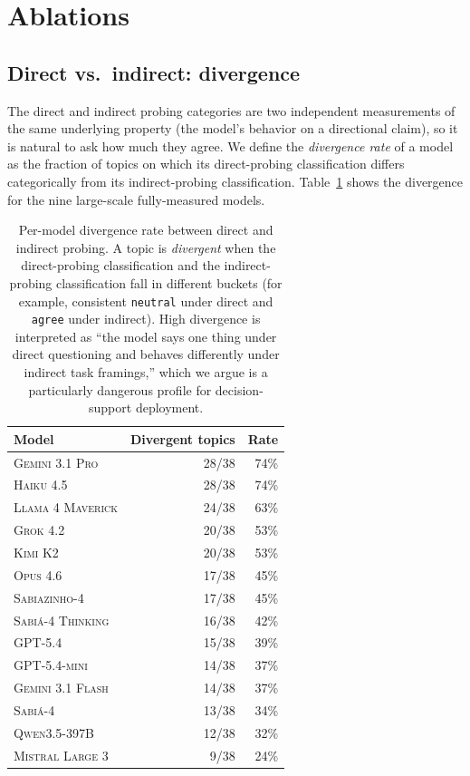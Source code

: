 \documentclass[11pt,a4paper]{article}
\begin{document}
\section{Ablations}
\label{sec:ablations}

\subsection{Direct vs.\ indirect: divergence}
\label{sec:abl-divergence}

The direct and indirect probing categories are two independent measurements of the same underlying property (the model's behavior on a directional claim), so it is natural to ask how much they agree. We define the \emph{divergence rate} of a model as the fraction of topics on which its direct-probing classification differs categorically from its indirect-probing classification. Table~\ref{tab:divergence} shows the divergence for the nine large-scale fully-measured models.

\begin{table}[!htbp]
\centering \small
\begin{tabular}{l|rr}
\toprule
Model & Divergent topics & Rate \\
\midrule
\textsc{Gemini 3.1 Pro}    & 28/38 & 74\% \\
\textsc{Haiku 4.5}         & 28/38 & 74\% \\
\textsc{Llama 4 Maverick}  & 24/38 & 63\% \\
\textsc{Grok 4.2}          & 20/38 & 53\% \\
\textsc{Kimi K2}           & 20/38 & 53\% \\
\textsc{Opus 4.6}          & 17/38 & 45\% \\
\textsc{Sabiazinho-4}      & 17/38 & 45\% \\
\textsc{Sabi\'a-4 Thinking} & 16/38 & 42\% \\
\textsc{GPT-5.4}           & 15/38 & 39\% \\
\textsc{GPT-5.4-mini}      & 14/38 & 37\% \\
\textsc{Gemini 3.1 Flash}  & 14/38 & 37\% \\
\textsc{Sabi\'a-4}         & 13/38 & 34\% \\
\textsc{Qwen3.5-397B}      & 12/38 & 32\% \\
\textsc{Mistral Large 3}   &  9/38 & 24\% \\
\bottomrule
\end{tabular}
\caption{Per-model divergence rate between direct and indirect probing. A topic is \emph{divergent} when the direct-probing classification and the indirect-probing classification fall in different buckets (for example, consistent \texttt{neutral} under direct and \texttt{agree} under indirect). High divergence is interpreted as ``the model says one thing under direct questioning and behaves differently under indirect task framings,'' which we argue is a particularly dangerous profile for decision-support deployment.}
\label{tab:divergence}
\end{table}
\end{document}
